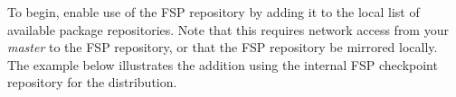 To begin, enable use of the FSP repository by adding it to the local list of
available package repositories.  Note that this requires network access from
your {\em master} to the FSP repository, or that the FSP repository be mirrored
locally. The example below illustrates the addition using the internal FSP
checkpoint repository for the \baseOS{} distribution.
